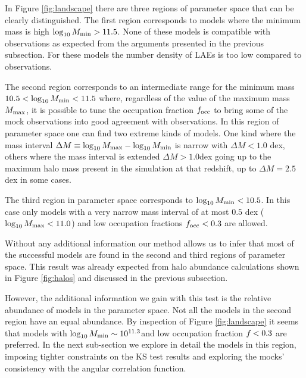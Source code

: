 \documentclass[usenatbib]{mn2e}
\newcommand{\hMsun}{{\ifmmode{h^{-1}{\rm
        {M_{\odot}}}}\else{$h^{-1}{\rm{M_{\odot}}}$}\fi}}
\begin{document}
In Figure \ref{fig:landscape} there are three regions of parameter
space that can be clearly distinguished. The first region corresponds
to models where the minimum mass is high $\log_{10}M_{\rm min}>
11.5$. None of these models is compatible with observations as expected
from the arguments presented in the previous subsection. For these
models the number density of LAEs is too low compared to
observations. 

 
The second region corresponds to an intermediate range for the minimum
mass $10.5<\log_{10}M_{\rm min}<11.5$ where, regardless of the value of
the maximum mass $M_{\rm max}$, it is possible to tune the occupation
fraction $f_{\rm occ}$ to bring some of the mock observations into
good agreement with observations. In this region of parameter space
one can find two extreme kinds of models.  One kind where the
mass interval $\Delta M\equiv \log_{10} M_{\rm max} - \log_{10}M_{\rm
  min}$ is narrow with $\Delta M<1.0$ dex, others where the mass interval is 
extended $\Delta M>1.0$dex going up to the maximum halo mass
present in the simulation at that redshift, up to $\Delta M = 2.5$ dex
in some cases.  
 
The third region in parameter space corresponds to $\log_{10}M_{\rm
  min}<10.5$. In this case only models with a very narrow mass interval of
at most $0.5$ dex ($\log_{10}M_{\rm max}<11.0$) and low
occupation fractions $f_{\rm occ}<0.3$ are allowed. 

Without any additional information our method allows us to infer that
most of the successful models are found in the second and third regions of
parameter space. This result was already expected from halo
abundance calculations shown in Figure \ref{fig:halos} and discussed
in the previous subsection. 

However, the additional information we gain with this test is the
relative abundance of models in the parameter space. Not all the
models in the second region have an equal abundance. By inspection of
Figure \ref{fig:landscape} it seems that models with $\log_{10}M_{\rm
  min}\sim 10^{11.3}$\hMsun and low occupation fraction $f_{\rm}<0.3$
are preferred.  In the next sub-section we explore in detail the
models in this region, imposing tighter constraints on the KS test
results and exploring the mocks' consistency with the angular correlation
function.  
\end{document}
